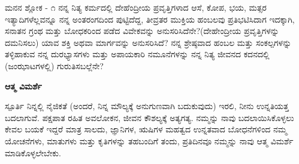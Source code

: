 \newpage
\begin{mananam}{\mananamfont \large ಮನನ ಶ್ಲೋಕ - ೧}
{\footnotesize \mananamtext ನನ್ನ ನಿತ್ಯ ಕರ್ಮದಲ್ಲಿ ದೇಹೆಂದ್ರೀಯ ಪ್ರವೃತ್ತಿಗಳಾದ ಆಸೆ, ಕೋಪ, ಭಯ, ಮತ್ಸರ ಇತ್ಯಾದಿಗಳೆಲ್ಲವನ್ನೂ ನನ್ನ ಅಂತರಂಗದಿಂದ ಪುಟ್ಟಿದೆದ್ದ, ತೀವ್ರತರ ಮುಕ್ತಿಯ ಹಂಬಲವು ಪ್ರತಿಭಟಿಸಿದಾಗ  ಇದಕ್ಕಾಗಿ, ಸನಾತನ ಗ್ರಂಥ ಮತ್ತು ಬೋಧಕರಿಂದ ಪಡೆದ ವಿವೇಕವನ್ನು ಅನುಸರಿಸಿದೆನೇ?(ದೇಹೇಂದ್ರೀಯ ಪ್ರವೃತ್ತಿಗಳನ್ನು ದಮನಿಸಲು)  ಯಾವ ಶಕ್ತಿ ಅಥವಾ ಮಾರ್ಗವನ್ನು ಅನುಸರಿಸಿದೆ?
ನನ್ನ ಶ್ರೇಷ್ಠವಾದ ಹಂಬಲ ಮತ್ತು ಸಂಕಲ್ಪಗಳನ್ನು ತಳ್ಳಿಹಾಕುವ ನನ್ನ ದುರಭ್ಯಾಸಗಳು ಮತ್ತು ಅಪಾಯಕಾರಿ ನಮೂನೆಗಳನ್ನು ನನ್ನ ನಿತ್ಯ ಜೀವನದ ಕದನದಲ್ಲಿ (ಜಂಝಾಟಗಳಲ್ಲಿ) ಗುರುತಿಸಬಲ್ಲೆನೇ?
}
\end{mananam}
\WritingHand\enspace\textbf{ಆತ್ಮ ವಿಮರ್ಶೆ}
\begin{inspiration}{\mananamfont \large ಸ್ಪೂರ್ತಿ}
{\footnotesize \mananamtext ನಿನ್ನಲ್ಲಿ ನೈಜಿಕತೆ (ಅಂದರೆ, ನಿನ್ನ ಮೌಲ್ಯಕ್ಕೆ ಅನುಗುಣವಾಗಿ ಬದುಕುವುದು) ಇರಲಿ,  ನೀನು ಉನ್ನತಿಯತ್ತ ಬದಲಾಗುವೆ.  ಪಕ್ಷಪಾತ ರಹಿತ ಅವಲೋಕನ, ಜೀವನ ಕೌಶಲ್ಯಕ್ಕೆ ಅತ್ಯಗತ್ಯ. ನಮ್ಮನ್ನು ನಾವು ಬದಲಾಯಿಸಿಕೊಳ್ಳಲು ಕೇವಲ ಬಯಕೆ ಇದ್ದರೆ ಮಾತ್ರ ಸಾಲದು, ಜ್ಞಾನಿಗಳ, ಋಷಿಗಳ ಮಹತ್ವದ ಉನ್ನತವಾದ ಬೋಧನೆಗಳಿಂದ ನಮ್ಮ ಯೋಚನೆಗಳು, ಮಾತುಗಳು ಮತ್ತು ಕೃತಿಗಳನ್ನು ತಹಬಂದಿಗೆ ತಂದು, ಪ್ರತಿದಿನವೂ ನಮ್ಮನ್ನು ನಾವು ಆತ್ಮ ವಿಮರ್ಶೆ ಮಾಡಿಕೊಳ್ಳಲೇಬೇಕು.}
\end{inspiration}
\newpage

